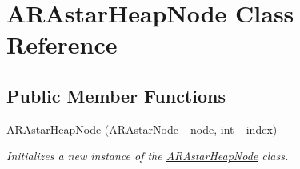 \hypertarget{class_a_r_astar_heap_node}{\section{A\-R\-Astar\-Heap\-Node Class Reference}
\label{class_a_r_astar_heap_node}
}
\subsection*{Public Member Functions}
\begin{DoxyCompactItemize}
\item 
\hyperlink{class_a_r_astar_heap_node_a024e3ef79561fc0c15a0f6420729e9b0}{A\-R\-Astar\-Heap\-Node} (\hyperlink{class_a_r_astar_node}{A\-R\-Astar\-Node} \-\_\-node, int \-\_\-index)
\begin{DoxyCompactList}\small\item\em Initializes a new instance of the \hyperlink{class_a_r_astar_heap_node}{A\-R\-Astar\-Heap\-Node} class. \end{DoxyCompactList}\end{DoxyCompactItemize}
